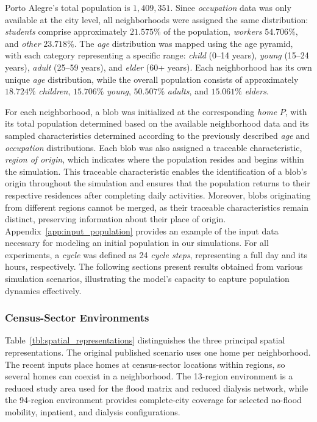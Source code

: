 \documentclass[pdflatex,sn-mathphys-num]{sn-jnl}%
\theoremstyle{thmstyleone}%
\theoremstyle{thmstyletwo}%
\theoremstyle{thmstylethree}%
\begin{document}
Porto Alegre's total population is $1,409,351$. Since \textit{occupation} data was only available at the city level, all neighborhoods were assigned the same distribution: \textit{students} comprise approximately $21.575\%$ of the population, \textit{workers} $54.706\%$, and \textit{other} $23.718\%$.
The \textit{age} distribution was mapped using the age pyramid, with each category representing a specific range: \textit{child} (0–14 years), \textit{young} (15–24 years), \textit{adult} (25–59 years), and \textit{elder} (60+ years). Each neighborhood has its own unique \textit{age} distribution, while the overall population consists of approximately $18.724\%$ \textit{children}, $15.706\%$ \textit{young}, $50.507\%$ \textit{adults}, and $15.061\%$ \textit{elders}. 

For each neighborhood, a blob was initialized at the corresponding \textit{home} $P$, with its total population determined based on the available neighborhood data and its sampled characteristics determined according to the previously described \textit{age} and \textit{occupation} distributions.
Each blob was also assigned a traceable characteristic, \textit{region of origin}, which indicates where the population resides and begins within the simulation. This traceable characteristic enables the identification of a blob's origin throughout the simulation and ensures that the population returns to their respective residences after completing daily activities. Moreover, blobs originating from different regions cannot be merged, as their traceable characteristics remain distinct, preserving information about their place of origin.
Appendix~\ref{app:input_population} provides an example of the input data necessary for modeling an initial population in our simulations.
For all experiments, a \textit{cycle} was defined as 24 \textit{cycle steps}, representing a full day and its hours, respectively. The following sections present results obtained from various simulation scenarios, illustrating the model's capacity to capture population dynamics effectively.




\subsubsection{Census-Sector Environments}
\label{evaluation:spatial}

Table~\ref{tbl:spatial_representations} distinguishes the three principal spatial representations. The original published scenario uses one home per neighborhood. The recent inputs place homes at census-sector locations within regions, so several homes can coexist in a neighborhood. The 13-region environment is a reduced study area used for the flood matrix and reduced dialysis network, while the 94-region environment provides complete-city coverage for selected no-flood mobility, inpatient, and dialysis configurations.
\end{document}

